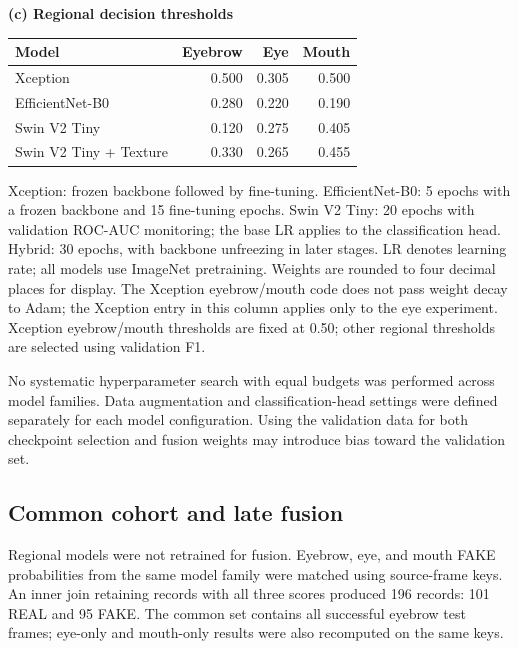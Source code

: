 \documentclass[a4paper]{elektr}
\begin{document}
\begin{table}[!htbp]
\begin{minipage}{15.8cm}
\par\medskip
\textbf{(c) Regional decision thresholds}\par\smallskip
\begin{tabular*}{\linewidth}{@{\extracolsep{\fill}}lrrr@{}}\toprule
Model & Eyebrow & Eye & Mouth\\\midrule
Xception & 0.500 & 0.305 & 0.500\\
EfficientNet-B0 & 0.280 & 0.220 & 0.190\\
Swin V2 Tiny & 0.120 & 0.275 & 0.405\\
Swin V2 Tiny + Texture & 0.330 & 0.265 & 0.455\\\bottomrule
\end{tabular*}
\par\smallskip\begin{minipage}{\linewidth}\small
Xception: frozen backbone followed by fine-tuning. EfficientNet-B0: 5 epochs with a frozen backbone and 15 fine-tuning epochs. Swin V2 Tiny: 20 epochs with validation ROC-AUC monitoring; the base LR applies to the classification head. Hybrid: 30 epochs, with backbone unfreezing in later stages. LR denotes learning rate; all models use ImageNet pretraining. Weights are rounded to four decimal places for display. The Xception eyebrow/mouth code does not pass weight decay to Adam; the Xception entry in this column applies only to the eye experiment. Xception eyebrow/mouth thresholds are fixed at 0.50; other regional thresholds are selected using validation F1.
\end{minipage}\end{minipage}\end{table}

No systematic hyperparameter search with equal budgets was performed across model families. Data augmentation and classification-head settings were defined separately for each model configuration. Using the validation data for both checkpoint selection and fusion weights may introduce bias toward the validation set.

\subsection{Common cohort and late fusion}
Regional models were not retrained for fusion. Eyebrow, eye, and mouth FAKE probabilities from the same model family were matched using source-frame keys. An inner join retaining records with all three scores produced 196 records: 101 REAL and 95 FAKE. The common set contains all successful eyebrow test frames; eye-only and mouth-only results were also recomputed on the same keys.
\end{document}
